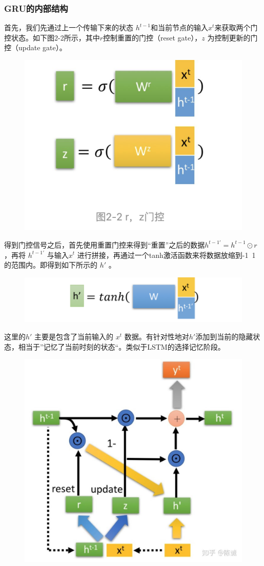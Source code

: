 \documentclass[12pt]{article}
\begin{document}
\subsubsection{GRU的内部结构}
首先，我们先通过上一个传输下来的状态 $h^{t-1}$和当前节点的输入$x^t$来获取两个门控状态。如下图2-2所示，其中$r$控制重置的门控（reset gate），$z$ 为控制更新的门控（update gate）。
\begin{figure}[H]
    \centering
    \includegraphics[width=.6\textwidth]{fig/GRU_RZ_Gate.png}
\end{figure}
 
得到门控信号之后，首先使用重置门控来得到“重置”之后的数据$h^{{t-1}'} = h^{t-1}\odot r$ ，再将 $h^{{t-1}'} $ 与输入$x^t$ 进行拼接，再通过一个tanh激活函数来将数据放缩到-1~1的范围内。即得到如下所示的 $h'$ 。
\begin{figure}[H]
    \centering
    \includegraphics[width=.6\textwidth]{fig/GRU_h_pie.png}
\end{figure}

这里的$h'$ 主要是包含了当前输入的 $x^t$ 数据。有针对性地对$h'$添加到当前的隐藏状态，相当于”记忆了当前时刻的状态“。类似于LSTM的选择记忆阶段。
\begin{figure}[H]
    \centering
    \includegraphics[width=.6\textwidth]{fig/GRU_Internal_Structure.jpg}
\end{figure}
\end{document}
